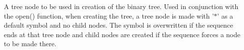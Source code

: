 A tree node to be used in creation of the binary tree. Used in conjunction with the open() function, when creating the tree, a tree node is made with '$\ast$' as a default symbol and no child nodes. The symbol is overwritten if the sequence ends at that tree node and child nodes are created if the sequence forces a node to be made there. 
